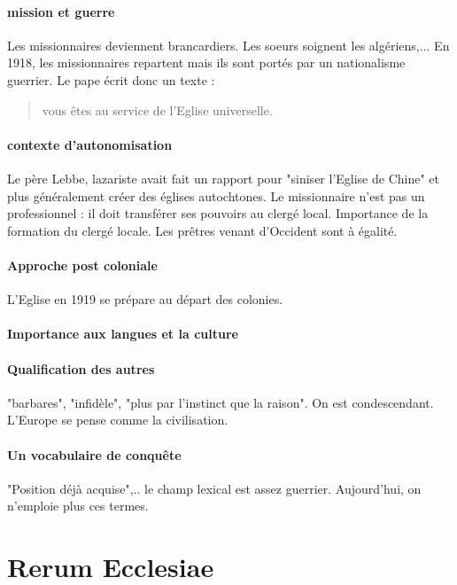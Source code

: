 \paragraph{mission et guerre} Les missionnaires deviennent brancardiers. Les soeurs soignent les algériens,... En 1918, les missionnaires repartent mais ils sont portés par un nationalisme guerrier.
Le pape écrit donc un texte :
\begin{quote}
    vous êtes au service de l'Eglise universelle. 
\end{quote}

\paragraph{contexte d'autonomisation}
Le père Lebbe, lazariste avait fait un rapport pour "siniser l'Eglise de Chine" et plus généralement créer des églises autochtones.
Le missionnaire n'est pas un professionnel : il doit transférer ses pouvoirs au clergé local. 
Importance de la formation du clergé locale. Les prêtres venant d'Occident sont à égalité.

\paragraph{Approche post coloniale} L'Eglise en 1919 se prépare au départ des colonies.

\paragraph{Importance aux langues et la culture}


\paragraph{Qualification des autres} "barbares", "infidèle", "plus par l'instinct que la raison". On est condescendant. L'Europe se pense comme la civilisation. 

\paragraph{Un vocabulaire de conquête} "Position déjà acquise",.. le champ lexical est assez guerrier. 
Aujourd'hui, on n'emploie plus ces termes.


\section{Rerum Ecclesiae}


